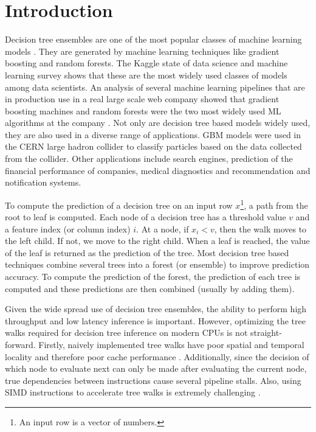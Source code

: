\section{Introduction}
Decision tree ensembles are one of the most popular classes of machine learning models \cite{KaggleSurvey,LookingGlass}.
They are generated by machine learning techniques like gradient boosting and random forests. 
The Kaggle state of data science and machine learning survey \cite{KaggleSurvey} shows that 
these are the most widely used classes of models among data scientists. An analysis of 
several machine learning pipelines that are in production use in a real large scale web company showed that 
gradient boosting machines and random forests were the two most widely used ML algorithms at the company \cite{LookingGlass}.
Not only are decision tree based models widely used, they are also used in a diverse range of 
applications\cite{DecisionTreesOverview}. GBM models were used in the CERN large hadron collider
to classify particles based on the data collected from the collider\cite{LHCModel}. Other applications 
include search engines\cite{YahooSearch}, prediction of the financial performance of companies\cite{Finance},
medical diagnostics\cite{Med1, Med2} and recommendation and notification systems\cite{Facebook}.

To compute the prediction of a decision tree on an input row $x$\footnote{An input row is a
vector of numbers.}, a path from the root to leaf is computed.
Each node of a decision tree has a threshold value $v$ and a feature index (or column index) $i$.
At a node, if $x_i < v$, then 
the walk moves to the left child. If not, we move to the right child. When a leaf is reached, 
the value of the leaf is returned as the prediction of the tree. 
Most decision tree based techniques combine several trees into a forest (or ensemble) to improve prediction accuracy.
To compute the prediction of the forest, the prediction of each tree is computed and these predictions are 
then combined (usually by adding them). 

Given the wide spread use of decision tree ensembles, the ability to perform high throughput and low latency inference is important.
However, optimizing the tree walks required for decision tree inference on modern CPUs is not straight-forward. 
Firstly, naively implemented tree walks have poor spatial and temporal locality and therefore poor cache performance \cite{FAST,MilindTreeVectorization}.
Additionally, since the decision of which node to evaluate next can only be made after evaluating the current node,
true dependencies between instructions cause several pipeline stalls. Also, using SIMD instructions to accelerate 
tree walks is extremely challenging \cite{MilindTreeVectorization}.

